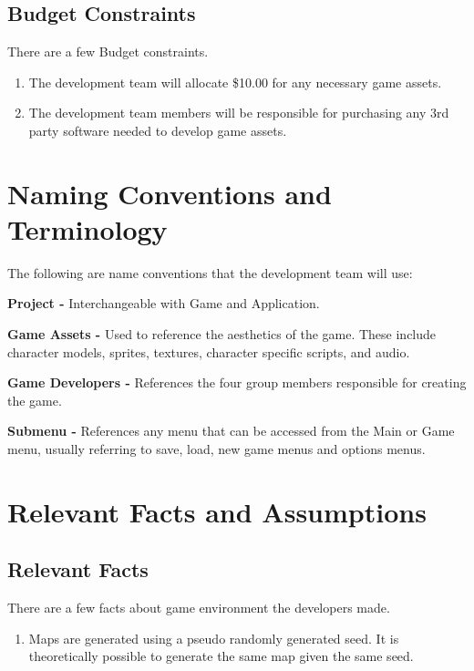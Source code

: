 \documentclass{article}
\begin{document}
\subsection{Budget Constraints}
\quad There are a few Budget constraints.
\begin{enumerate}[{BC}1. ]
	\item The development team will allocate \$10.00 for any necessary game assets.
	\item The development team members will be responsible for purchasing any 3rd party software needed to develop game assets.
\end{enumerate}
\section{Naming Conventions and Terminology}
\quad The following are name conventions that the development team will use: \par
\textbf{Project - }Interchangeable with Game and Application. \par
\textbf{Game Assets - }Used to reference the aesthetics of the game. These include character models, sprites, textures, character specific scripts, and audio. \par
\textbf{Game Developers - }References the four group members responsible for creating the game. \par
\textbf{Submenu - }References any menu that can be accessed from the Main or Game menu, usually referring to save, load, new game menus and options menus. \par
\section{Relevant Facts and Assumptions}
\subsection{Relevant Facts}
\quad There are a few facts about game environment the developers made.
\begin{enumerate}[{RF}1. ]
	\item Maps are generated using a pseudo randomly generated seed. It is theoretically possible to generate the same map given the same seed.
\end{enumerate}
\end{document}
